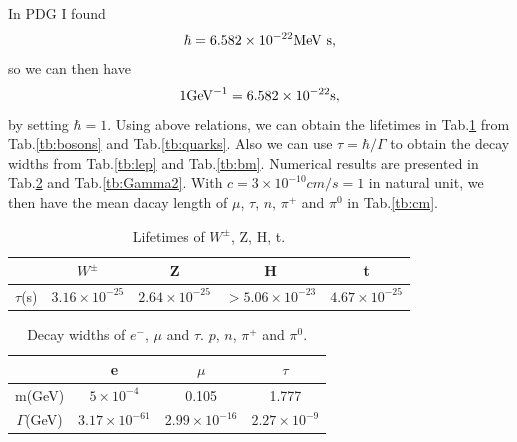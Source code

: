 \documentclass[11pt]{article}
\begin{document}
\section { }
In PDG I found
\begin{eqnarray}
  \hbar= 6.582 \times 10^{-22} {\rm MeV~s},
\end{eqnarray} 
so we can then have
\begin{eqnarray}
  1 {\rm GeV}^{-1}= 6.582 \times 10^{-22} {\rm s},
\end{eqnarray}
by setting $\hbar=1$.
Using above relations, we can obtain the lifetimes in Tab.\ref{tb:tau} from Tab.\ref{tb:bosons} and Tab.\ref{tb:quarks}. Also we can use $\tau=\hbar/\Gamma$ to obtain the decay widths from Tab.\ref{tb:lep} and Tab.\ref{tb:bm}. Numerical results are presented in Tab.\ref{tb:Gamma} and Tab.\ref{tb:Gamma2}. With $c=3 \times 10^{-10} cm/s = 1$ in natural unit, we then have the mean dacay length of $\mu$, $\tau$, $n$, $\pi^+$ and $\pi^0$ in Tab.\ref{tb:cm}. 

\begin{table}[]
  \centering
  \caption{Lifetimes of $W^{\pm}$, Z, H, t.}
  \label{tb:tau}
  \begin{tabular}{|c|c|c|c|c|}
  \hline
            & $W^{\pm}$              & Z                     & H                       & t                     \\ \hline
  $\tau$(s) & $3.16 \times 10^{-25}$ & $2.64\times 10^{-25}$ & $>5.06 \times 10^{-23}$ & $4.67 \times10^{-25}$ \\ \hline
  \end{tabular}
\end{table}


\begin{table}[]
  \centering
  \caption{Decay widths of $e^-$, $\mu$ and $\tau$. $p$, $n$, $\pi^+$ and $\pi^0$.}
  \label{tb:Gamma}
  \begin{tabular}{|c|c|c|c|}
  \hline
                & e                      & $\mu$                  & $\tau$                 \\ \hline
  m(GeV)        & $5 \times 10^{-4}$     & 0.105                  & 1.777                  \\ \hline
  $\Gamma$(GeV) & $3.17 \times 10^{-61}$ & $2.99 \times 10^{-16}$ & $2.27 \times 10^{-9}$ \\ \hline
  \end{tabular}
\end{table}
\end{document}
